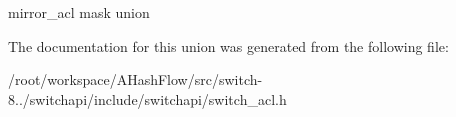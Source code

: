 mirror\+\_\+acl mask union 

The documentation for this union was generated from the following file\+:\begin{DoxyCompactItemize}
\item 
/root/workspace/\+A\+Hash\+Flow/src/switch-\/8../switchapi/include/switchapi/switch\+\_\+acl.\+h\end{DoxyCompactItemize}
